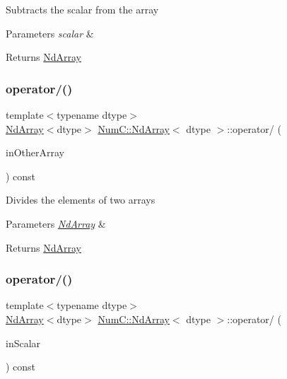 Subtracts the scalar from the array


\begin{DoxyParams}{Parameters}
{\em scalar} & \\
\hline
\end{DoxyParams}
\begin{DoxyReturn}{Returns}
\mbox{\hyperlink{class_num_c_1_1_nd_array}{Nd\+Array}} 
\end{DoxyReturn}
\mbox{\label{class_num_c_1_1_nd_array_a931a3c3251279020beab2c1f198283a7}} 
\subsubsection{\texorpdfstring{operator/()}{operator/()}\hspace{0.1cm}{\footnotesize\ttfamily [1/2]}}
{\footnotesize\ttfamily template$<$typename dtype$>$ \\
\mbox{\hyperlink{class_num_c_1_1_nd_array}{Nd\+Array}}$<$dtype$>$ \mbox{\hyperlink{class_num_c_1_1_nd_array}{Num\+C\+::\+Nd\+Array}}$<$ dtype $>$\+::operator/ (\begin{DoxyParamCaption}\item[{const \mbox{\hyperlink{class_num_c_1_1_nd_array}{Nd\+Array}}$<$ dtype $>$ \&}]{in\+Other\+Array }\end{DoxyParamCaption}) const\hspace{0.3cm}{\ttfamily [inline]}}

Divides the elements of two arrays


\begin{DoxyParams}{Parameters}
{\em \mbox{\hyperlink{class_num_c_1_1_nd_array}{Nd\+Array}}} & \\
\hline
\end{DoxyParams}
\begin{DoxyReturn}{Returns}
\mbox{\hyperlink{class_num_c_1_1_nd_array}{Nd\+Array}} 
\end{DoxyReturn}
\mbox{\label{class_num_c_1_1_nd_array_ae650e8fc96a390cc8e1d159c45c5fd1a}} 
\subsubsection{\texorpdfstring{operator/()}{operator/()}\hspace{0.1cm}{\footnotesize\ttfamily [2/2]}}
{\footnotesize\ttfamily template$<$typename dtype$>$ \\
\mbox{\hyperlink{class_num_c_1_1_nd_array}{Nd\+Array}}$<$dtype$>$ \mbox{\hyperlink{class_num_c_1_1_nd_array}{Num\+C\+::\+Nd\+Array}}$<$ dtype $>$\+::operator/ (\begin{DoxyParamCaption}\item[{dtype}]{in\+Scalar }\end{DoxyParamCaption}) const\hspace{0.3cm}{\ttfamily [inline]}}

